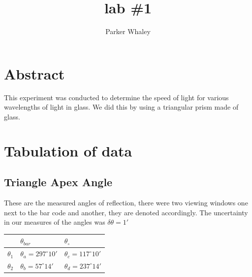 \documentclass[12pt,a4paper]{article}
\author{Parker Whaley}
\title{lab \#1}
\begin{document}
\maketitle

\section{Abstract}
This experiment was conducted to determine the speed of light for various wavelengths of light in glass.  We did this by using a triangular prism made of glass.

\section{Tabulation of data}
\subsection{Triangle Apex Angle}
These are the measured angles of reflection, there were two viewing windows one next to the bar code and another, they are denoted accordingly.  The uncertainty in our measures of the angles was $\delta\theta=1'$\\
\begin{tabular}{| l | l | l |}
\hline
  & $\theta_{bar}$ & $\theta_{\circ}$\\
\hline
$\theta_1$ & $\theta_a= 297^\circ 10'$ & $\theta_c =117^\circ 10'$\\
\hline
$\theta_2$ & $\theta_b= 57^\circ 14'$ & $\theta_d= 237^\circ 14'$\\
\hline

\end{tabular}
\\
\end{document}
